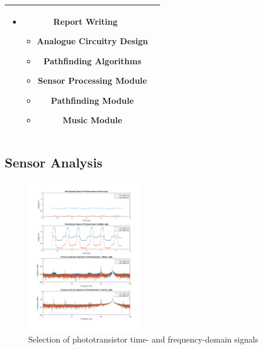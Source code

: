 \documentclass[conference]{IEEEtran}
\begin{document}
\begin{tabularx}{\linewidth}{ | c | X | }
\begin{itemize}
		         \item Report Writing
		               \begin{itemize}
			      \item Analogue Circuitry Design
			      \item Pathfinding Algorithms
			      \item Sensor Processing Module
			      \item Pathfinding Module
			      \item Music Module
		      \end{itemize}
	         \end{itemize} \\
	\hline
\end{tabularx}
\egroup

\subsection{Sensor Analysis}

\begin{figure}[H]
	\centerline{\includegraphics[width=0.45\textwidth]{sensor-matlab.png}}
	\caption{Selection of phototransistor time- and frequency-domain signals}
	\label{fig:sensor-matlab}
\end{figure}
\end{document}
